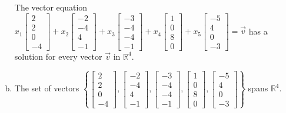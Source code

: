 \begin{exerciseAnswer}
\begin{enumerate}[(a)]
\begin{center}\begin{minipage}{0.8\textwidth}
 The vector equation \( x_{1} \left[\begin{array}{c}
2 \\
2 \\
0 \\
-4
\end{array}\right] + x_{2} \left[\begin{array}{c}
-2 \\
-4 \\
4 \\
-1
\end{array}\right] + x_{3} \left[\begin{array}{c}
-3 \\
-4 \\
-4 \\
-1
\end{array}\right] + x_{4} \left[\begin{array}{c}
1 \\
0 \\
8 \\
0
\end{array}\right] + x_{5} \left[\begin{array}{c}
-5 \\
4 \\
0 \\
-3
\end{array}\right] =\vec{v}\) has a solution for every vector \(\vec{v}\) in \(\mathbb{R}^4\). 
\end{minipage}\end{center}
    
\item  The set of vectors \( \left\{ \left[\begin{array}{c}
2 \\
2 \\
0 \\
-4
\end{array}\right] , \left[\begin{array}{c}
-2 \\
-4 \\
4 \\
-1
\end{array}\right] , \left[\begin{array}{c}
-3 \\
-4 \\
-4 \\
-1
\end{array}\right] , \left[\begin{array}{c}
1 \\
0 \\
8 \\
0
\end{array}\right] , \left[\begin{array}{c}
-5 \\
4 \\
0 \\
-3
\end{array}\right] \right\} \) spans \(\mathbb{R}^4\). 
\end{enumerate}
    
\end{exerciseAnswer}
    
